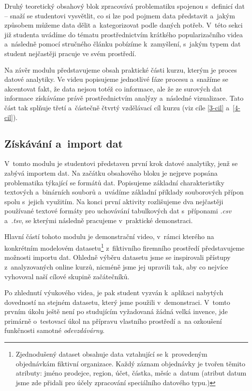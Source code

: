 Druhý teoretický obsahový blok zpracovává problematiku spojenou s~definicí dat -- snaží se studentovi vysvětlit, co si lze pod pojmem data představit a~jakým způsobem můžeme data dělit a~kategorizovat podle daných potřeb. V~této sekci již studenta uvádíme do tématu prostřednictvím krátkého popularizačního videa a~následně pomocí stručného článku pobízíme k~zamyšlení, s~jakým typem dat student nejčastěji pracuje ve svém prostředí.

Na závěr modulu představujeme obsah praktické části kurzu, kterým je proces datové analytiky. Ve videu popisujeme jednotlivé fáze procesu a~snažíme se akcentovat fakt, že data nejsou totéž co informace, ale že ze surových dat informace získáváme právě prostřednictvím analýzy a~následné vizualizace. Tato část tak splňuje třetí a~částečně čtvrtý vzdělávací cíl kurzu (viz cíle \ref{3-cil} a~\ref{4-cil}).

\hypertarget{zuxedskuxe1vuxe1nuxed-a-import-dat}{%
\subsection{Získávání a~import dat}\label{zuxedskuxe1vuxe1nuxed-a-import-dat}}

V~tomto modulu je studentovi představen první krok datové analytiky, jenž se zabývá importem dat. Na začátku obsahového bloku je nejprve popsána problematika týkající se formátů dat. Popisujeme základní charakteristiky textových a~binárních souborů a~uvádíme základní příklady souborových přípon spolu s~jejich využitím. Na konci první aktivity rozlišujeme dva nejčastěji používané textové formáty pro uchovávání tabulkových dat s~příponami \emph{.csv} a~\emph{.tsv}, se kterými následně pracujeme v~praktické demonstraci.

Hlavní částí tohoto modulu je demonstrační video, v~rámci kterého na konkrétním modelovém datasetu\footnote{Zjednodušený dataset obsahuje data vztahující se k~provedeným objednávkám fiktivní organizace. Každý záznam objednávky je tvořen těmito atributy: jméno prodejce, region, účet, částka, měsíc a~datum (atribut datum jsme zde přidali pro účely zpracování speciálního datového typu.)} z~fiktivního firemního prostředí představujeme možnosti importu dat. Ohledně výběru datasetu jsme se inspirovali přístupy z~analyzovaných online kurzů, nicméně jsme jej upravili tak, aby co nejvíce vyhovoval naší cílové skupině začátečníků.

Po zhlednutí výukového videa, je pak student vyzván k~aplikaci nabytých dovedností na stejném datasetu, který jsme použili v~demonstraci. V~tomto prvním úkolu ještě není po studujícím vyžadovaná žádná velká invence, jde primárně o~testovací úkol na přípravu vlastního prostředí a~na ozkoušení funkčnosti samotné \emph{odevzdávárny}.


